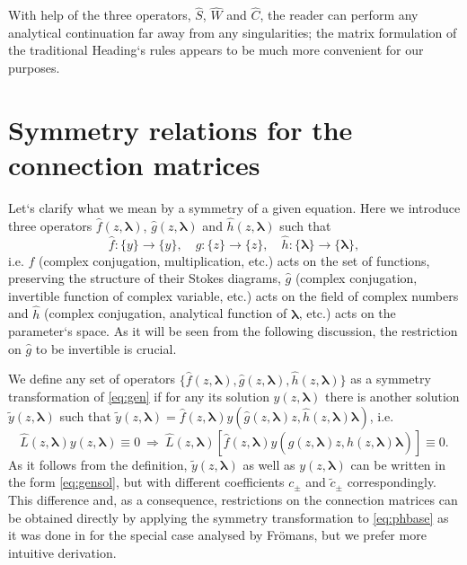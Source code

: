 \documentclass[atmp]{ipart_v1}
\def\LL{\widehat{L}}
\def\lmbd{\bm{\lambda}}
\def\f{\hat{f}}
\def\g{\hat{g}}
\def\h{\hat{h}}
\def\S{\widehat{S}}
\def\W{\widehat{W}}
\def\C{\widehat{C}}
\newcommand\eref[1]{\eqref{#1}}
\begin{document}
With help of the three operators, $\S$, $\W$ and $\C$, the reader can perform any analytical continuation far
away from any singularities; the matrix formulation of the traditional Heading`s rules appears
to be much more convenient for our purposes.















\section{Symmetry relations for the connection matrices \label{sec:fmtrsymm}}

Let`s clarify what we mean by a symmetry of a given equation. Here we introduce three operators
$\f(z,\lmbd)$, $\g(z,\lmbd)$ and $\h(z,\lmbd)$ such that
\begin{equation}
\f:\{y\} \rightarrow \{y\}, \quad
\g:\{z\} \rightarrow \{z\}, \quad
\h:\{\lmbd\} \rightarrow \{\lmbd\},
\end{equation}
i.e. $\f$ (complex conjugation, multiplication, etc.) acts on the set of functions, preserving 
the structure of their Stokes diagrams, $\g$ (complex conjugation, invertible function of 
complex variable, etc.) acts on the field of complex numbers and $\h$ (complex conjugation, 
analytical function of $\lmbd$, etc.) acts on the parameter`s space. As it will be seen from the
following discussion, the restriction on $\g$ to be invertible is crucial. 

We define any set of operators $\{\f(z,\lmbd),\g(z,\lmbd),\h(z,\lmbd)\}$ as a symmetry 
transformation of \eref{eq:gen}
if for any its solution $y(z,\lmbd)$ there is another solution $\tilde{y}(z,\lmbd)$ such that
$\tilde{y}(z,\lmbd)=\f(z,\lmbd)y(\g(z,\lmbd)z,\h(z,\lmbd)\lmbd)$, i.e.
\begin{equation}
\LL(z,\lmbd)y(z,\lmbd) \equiv 0 \ \Longrightarrow\  
\LL(z,\lmbd) \left[ \f(z,\lmbd)y(\g(z,\lmbd)z,\h(z,\lmbd)\lmbd) \right] \equiv 0.   \label{eq:symdef}
\end{equation}
As it follows from the definition, 
$\tilde{y}(z,\lmbd)$ as well as $y(z,\lmbd)$ can be written in the form \eref{eq:gensol},
but with different coefficients $c_\pm$ and $\tilde{c}_\pm$ correspondingly. 
This difference and, as a consequence, restrictions on the connection matrices 
can be obtained directly by applying the symmetry transformation to \eref{eq:phbase} as it was 
done in \cite{frsymm} for the special case analysed by Fr\"omans, but we prefer more intuitive derivation.
\end{document}
